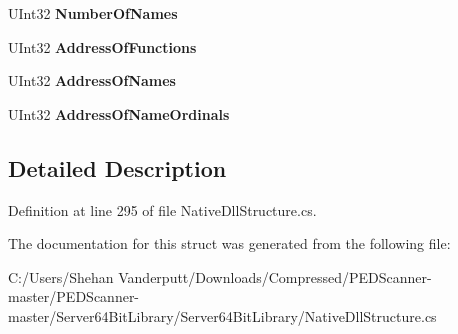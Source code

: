 \begin{DoxyCompactItemize}
U\+Int32 {\bfseries Number\+Of\+Names}
\item 
\mbox{\label{struct_class_library_server_1_1_struct_1_1_i_m_a_g_e___e_x_p_o_r_t___d_i_r_e_c_t_o_r_y_ae90f160fd1dcff7671427c2277f2a29d}} 
U\+Int32 {\bfseries Address\+Of\+Functions}
\item 
\mbox{\label{struct_class_library_server_1_1_struct_1_1_i_m_a_g_e___e_x_p_o_r_t___d_i_r_e_c_t_o_r_y_adf8c46c4d841d9f381bcb6ee52d2e7e9}} 
U\+Int32 {\bfseries Address\+Of\+Names}
\item 
\mbox{\label{struct_class_library_server_1_1_struct_1_1_i_m_a_g_e___e_x_p_o_r_t___d_i_r_e_c_t_o_r_y_ae1ef775787cf8ac4e2b8d0338b7fea70}} 
U\+Int32 {\bfseries Address\+Of\+Name\+Ordinals}
\end{DoxyCompactItemize}


\subsection{Detailed Description}


Definition at line 295 of file Native\+Dll\+Structure.\+cs.



The documentation for this struct was generated from the following file\+:\begin{DoxyCompactItemize}
\item 
C\+:/\+Users/\+Shehan Vanderputt/\+Downloads/\+Compressed/\+P\+E\+D\+Scanner-\/master/\+P\+E\+D\+Scanner-\/master/\+Server64\+Bit\+Library/\+Server64\+Bit\+Library/Native\+Dll\+Structure.\+cs\end{DoxyCompactItemize}
